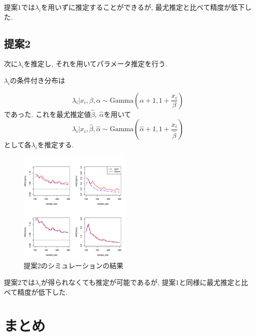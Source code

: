\documentclass[12pt,dvipdfmx]{beamer}
\begin{document}
\begin{frame}
提案$1$では$\lambda_{i}$を用いずに推定することができるが, 最尤推定と比べて精度が低下した. 
\end{frame}

\subsection{提案2}
\begin{frame}
次に$\lambda_{i}$を推定し, それを用いてパラメータ推定を行う.

$\lambda_{i}$の条件付き分布は

$$
\lambda _{i}|x_i,\beta ,\alpha 
\sim 
\mbox{Gamma} \left(\alpha +1,1+\frac{x_{i}}{\beta }\right)
$$
であった.
これを最尤推定値$\hat{\beta },~\hat{\alpha }$を用いて
$$
\lambda _{i}|x_i,\hat{\beta } ,\hat{\alpha } 
\sim 
\mbox{Gamma} \left(\hat{\alpha } +1,1+\frac{x_{i}}{\hat{\beta }}\right)
$$
として各$\lambda_i$を推定する.

\end{frame}


\begin{frame}
\begin{figure}[ht]
\begin{center}
\includegraphics[width=55mm]{mle-bayes}
\caption{提案2のシミュレーションの結果}
\end{center}
\end{figure}
\end{frame}



\begin{frame}
提案$2$では$\lambda_{i}$が得られなくても推定が可能であるが, 提案$1$と同様に最尤推定と比べて精度が低下した. 
\end{frame}

\section{まとめ}
\end{document}
